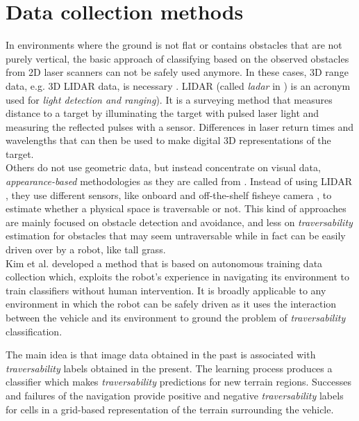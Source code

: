 \documentclass[12pt,a4paper]{report}
\newcommand{\term}{\textit}
\newcommand{\acronym}{\MakeUppercase}
\begin{document}
	\section{Data collection methods}
	\label{sec:bg:data}
	
	In environments where the ground is not flat or contains obstacles that are 
	not purely vertical, the basic approach of classifying based on the observed 
	obstacles from \acronym{2d} laser scanners can not be safely used anymore. 
	In these cases, \acronym{3d} range data, e.g. \acronym{3d} \acronym{lidar} 
	data, is necessary \cite{Suger, Lalonde}. \acronym{lidar} (called \term{ladar} 
	in \cite{Lalonde, Shneier}) is an acronym used for \term{light detection and 
	ranging}). It is a surveying method that measures distance to a target by 
	illuminating the target with pulsed laser light and measuring the reflected 
	pulses with a sensor. Differences in laser return times and wavelengths that 
	can then be used to make digital \acronym{3d} representations of the target.
	\\
	
	Others do not use geometric data, but instead concentrate on visual data, 
	\term{appearance-based} methodologies as they are called from \cite{Papadakis}. 
	Instead of using \acronym{lidar} \cite{Lalonde, Suger}, they use different 
	sensors, like onboard and off-the-shelf fisheye camera \cite{Hirose}, to 
	estimate whether a physical space is traversable or not. This kind of 
	approaches are mainly focused on obstacle detection and avoidance, and less 
	on \term{traversability} estimation for obstacles that may seem untraversable 
	while in fact can be easily driven over by a robot, like tall grass.
	\\
	
	
	
	
	
	Kim et al. \cite{Kim} developed a method 
	that is based on autonomous training data collection which, exploits the 
	robot’s experience in navigating its environment to train classifiers without 
	human intervention. It is broadly applicable to any environment in which 
	the robot can be safely driven as it uses the interaction between the vehicle
	and its environment to ground the problem of \term{traversability} classification.
	
	The main idea is that image data  obtained in the past is associated with 
	\term{traversability} labels obtained in the  present. The learning process produces a 
	classifier which makes \term{traversability}  predictions for new terrain regions. 
	Successes and failures of the navigation provide positive and negative 
	\term{traversability} labels for cells in a grid-based representation of the terrain surrounding 
	the vehicle.
	
\end{document}
